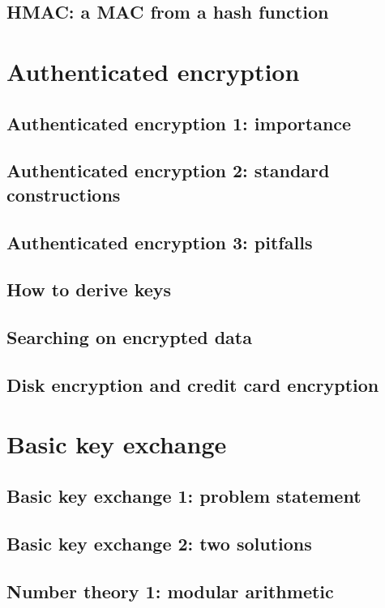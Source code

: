 \documentclass[10pt,a4paper]{report}
\begin{document}
\section{HMAC: a MAC from a hash function}

\chapter{Authenticated encryption}

\section{Authenticated encryption 1: importance}
\section{Authenticated encryption 2: standard constructions}
\section{Authenticated encryption 3: pitfalls}
\section{How to derive keys}
\section{Searching on encrypted data}
\section{Disk encryption and credit card encryption}

\chapter{Basic key exchange}

\section{Basic key exchange 1: problem statement}
\section{Basic key exchange 2: two solutions}
\section{Number theory 1: modular arithmetic}
\end{document}
